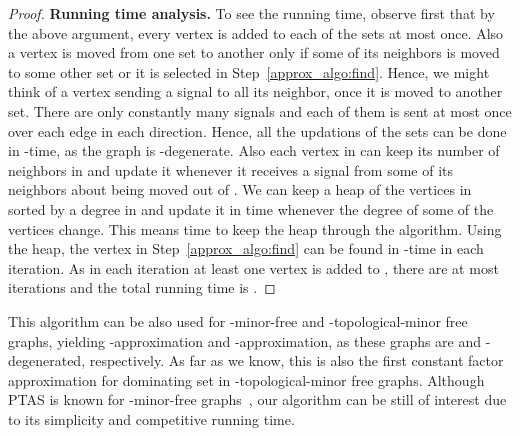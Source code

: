 \begin{proof}
 \noindent
{\bf Running time analysis.} 
To see the running time, observe first that by the above argument, every vertex is added to each of the sets at most once. Also a vertex is moved from one set to another only if some of its neighbors is moved to some other set or it is selected in Step~\ref{approx_algo:find}. Hence, we might think of a vertex sending a signal to all its neighbor, once it is moved to another set. There are only constantly many signals and each of them is sent at most once over each edge in each direction. Hence, all the updations of the sets can be done in -time, as the graph is -degenerate. 
Also each vertex in  can keep its number of neighbors in  and update it whenever it receives a signal from some of its neighbors about being moved out of . We can keep a heap of the vertices in  sorted by a degree in   and update it in  time whenever the degree of some of the vertices change. This means  time to keep the heap through the algorithm. Using the heap, the vertex  in Step~\ref{approx_algo:find} can be found in -time in each iteration. As in each iteration at least one vertex is added to , there are at most  iterations and the total running time is .
\end{proof}

This algorithm can be also used for -minor-free and -topological-minor free graphs, yielding -approximation and -approximation, as these graphs are  and -degenerated, respectively. As far as we know, this is also the first constant factor approximation for dominating set in -topological-minor free graphs. Although PTAS is known for -minor-free graphs~\cite{Grohe03}, our algorithm can be still of interest due to its simplicity and competitive running time.